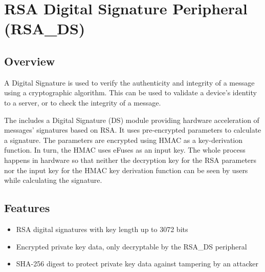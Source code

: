 \documentclass[main\_\_EN.tex]{subfiles}
\begin{document}

\ifglobal
\else
    {\let\clearpage\relax \listoftodos}
    \tableofcontents
\fi



\chapter{RSA Digital Signature Peripheral (RSA\_DS)}
\label{mod:digsig}
\hypertarget{digsig}{}\hypertarget{rsads}{}

\section{Overview}

A Digital Signature is used to verify the authenticity and integrity of a message using a cryptographic algorithm. This can be used to validate a device's identity to a server, or to check the integrity of a message.

The \chipname{} includes a Digital Signature (DS) module providing hardware acceleration of messages' signatures based on RSA. It uses pre-encrypted parameters to calculate a signature. The parameters are encrypted using HMAC as a key-derivation function. In turn, the HMAC uses eFuses as an input key. The whole process happens in hardware so that neither the decryption key for the RSA parameters nor the input key for the HMAC key derivation function can be seen by users while calculating the signature. 

\section{Features}

\begin{itemize}
\item RSA digital signatures with key length up to 3072 bits
\item Encrypted private key data, only decryptable by the RSA\_DS peripheral
\item SHA-256 digest to protect private key data against tampering by an attacker
\end{itemize}
\end{document}
